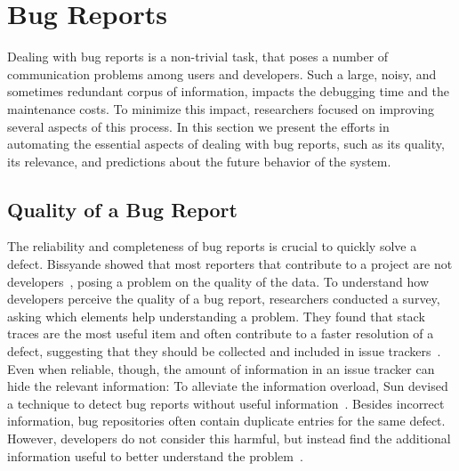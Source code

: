 


\section{Bug Reports}\label{sec:related-reports}

Dealing with bug reports is a non-trivial task, that poses a number of communication problems among users and developers.
Such a large, noisy, and sometimes redundant corpus of information, impacts the debugging time and the maintenance costs.
To minimize this impact, researchers focused on improving several aspects of this process.
In this section we present the efforts in automating the essential aspects of dealing with bug reports, such as its quality, its relevance, and predictions about the future behavior of the system.

\subsection{Quality of a Bug Report}

The reliability and completeness of bug reports is crucial to quickly solve a defect.
Bissyande \etal showed that most reporters that contribute to a project are not developers~\cite{Biss2013b}, posing a problem on the quality of the data.
To understand how developers perceive the quality of a bug report, researchers conducted a survey, asking which elements help understanding a problem.
They found that stack traces are the most useful item and often contribute to a faster resolution of a defect, suggesting that they should be collected and included in issue trackers~\cite{Zimm2010a,Bett2007,Schr2010a}.
Even when reliable, though, the amount of information in an issue tracker can hide the relevant information: To alleviate the information overload, Sun devised a technique to detect bug reports without useful information~\cite{Sun2011}.
Besides incorrect information, bug repositories often contain duplicate entries for the same defect.
However, developers do not consider this harmful, but instead find the additional information useful to better understand the problem~\cite{Bett2008a}.

